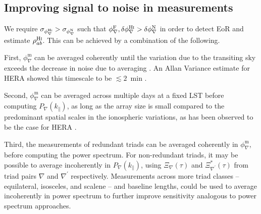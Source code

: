 \documentclass[
reprint,
superscriptaddress,
amsmath,
amssymb,
aps,
prd
]{revtex4-1}
\begin{document}
\subsection{Improving signal to noise in measurements}\label{sec:averaging}

We require $\sigma_{\phi_\nabla^\textrm{H{\sc i}}} > \sigma_{\phi_\nabla^\textrm{N}}$ such that $\phi_\nabla^\textrm{F}, \delta\phi_\nabla^\textrm{H{\sc i}} > \delta\phi_\nabla^\textrm{N}$ in order to detect EoR and estimate $\rho_{ab}^\textrm{H{\sc i}}$. This can be achieved by a combination of the following.



First, $\phi_\nabla^\textrm{m}$ can be averaged coherently until the variation due to the transiting sky exceeds the decrease in noise due to averaging \cite{car18}. An Allan Variance estimate for HERA showed this timescale to be $\lesssim 2$~min \cite{car18}.

Second, $\phi_\nabla^\textrm{m}$ can be averaged across multiple days at a fixed LST before computing $P_\nabla(k_\parallel)$, as long as the array size is small compared to the predominant spatial scales in the ionospheric variations, as has been observed to be the case for HERA \cite{car18}. 

Third, the measurements of redundant triads can be averaged coherently in $\phi_\nabla^\textrm{m}$, before computing the power spectrum.  For non-redundant triads, it may be possible to average incoherently in $P_\nabla(k_\parallel)$, using  $\Xi_\nabla(\tau)$ and $\Xi_{\nabla^\prime}^*(\tau)$ from triad pairs $\nabla$ and $\nabla^\prime$ respectively. Measurements across more triad classes -- equilateral, isosceles, and scalene -- and baseline lengths, could be used to average incoherently in power spectrum to further improve sensitivity analogous to power spectrum approaches. 
\end{document}
